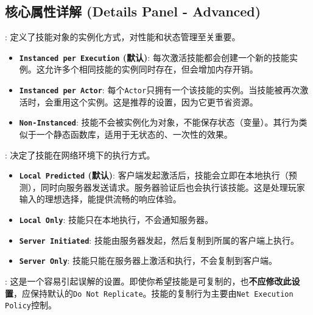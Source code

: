 \documentclass[10pt,CJKmath]{zhbook-v1}
\newcommand{\il}[1]{\texttt{#1}}%
\begin{document}
\subsection{核心属性详解 (Details Panel - Advanced)}
\begin{description}
    \item {}: 定义了技能对象的实例化方式，对性能和状态管理至关重要。
    \begin{itemize}
        \item \textbf{\texttt{Instanced per Execution} (默认)}: 每次激活技能都会创建一个新的技能实例。这允许多个相同技能的实例同时存在，但会增加内存开销。
        \item \textbf{\texttt{Instanced per Actor}}: 每个\texttt{Actor}只拥有一个该技能的实例。当技能被再次激活时，会重用这个实例。这是推荐的设置，因为它更节省资源。
        \item \textbf{\texttt{Non-Instanced}}: 技能不会被实例化为对象，不能保存状态（变量）。其行为类似于一个静态函数库，适用于无状态的、一次性的效果。
    \end{itemize}
    
    \item{}: 决定了技能在网络环境下的执行方式。
    \begin{itemize}
        \item \textbf{\texttt{Local Predicted} (默认)}: 客户端发起激活后，技能会立即在本地执行（预测），同时向服务器发送请求。服务器验证后也会执行该技能。这是处理玩家输入的理想选择，能提供流畅的响应体验。
        \item \textbf{\texttt{Local Only}}: 技能只在本地执行，不会通知服务器。
        \item \textbf{\texttt{Server Initiated}}: 技能由服务器发起，然后复制到所属的客户端上执行。
        \item \textbf{\texttt{Server Only}}: 技能只能在服务器上激活和执行，不会复制到客户端。
    \end{itemize}
    
    \item{}: 这是一个容易引起误解的设置。即使你希望技能是可复制的，也\textbf{不应修改此设置}，应保持默认的\il{Do Not Replicate}。技能的复制行为主要由\il{Net Execution Policy}控制。
    

\end{description}
\end{document}
